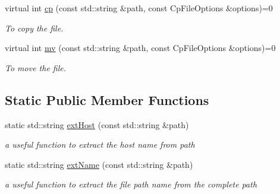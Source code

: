 \begin{DoxyCompactItemize}
virtual int \hyperlink{classFile_a29eed199fb54187949ecd0cb5828a376}{cp} (const std::string \&path, const CpFileOptions \&options)=0
\begin{DoxyCompactList}\small\item\em To copy the file. \item\end{DoxyCompactList}\item 
virtual int \hyperlink{classFile_acc9987632d392f01748ea4f58455c4d0}{mv} (const std::string \&path, const CpFileOptions \&options)=0
\begin{DoxyCompactList}\small\item\em To move the file. \item\end{DoxyCompactList}\end{DoxyCompactItemize}
\subsection*{Static Public Member Functions}
\begin{DoxyCompactItemize}
\item 
static std::string \hyperlink{classFile_ab91c3d08d46d0d2dac03cce0e912add5}{extHost} (const std::string \&path)
\begin{DoxyCompactList}\small\item\em a useful function to extract the host name from path \item\end{DoxyCompactList}\item 
static std::string \hyperlink{classFile_aec682e21e601fd41e09a612485e94e27}{extName} (const std::string \&path)
\begin{DoxyCompactList}\small\item\em a useful function to extract the file path name from the complete path \item\end{DoxyCompactList}\end{DoxyCompactItemize}
